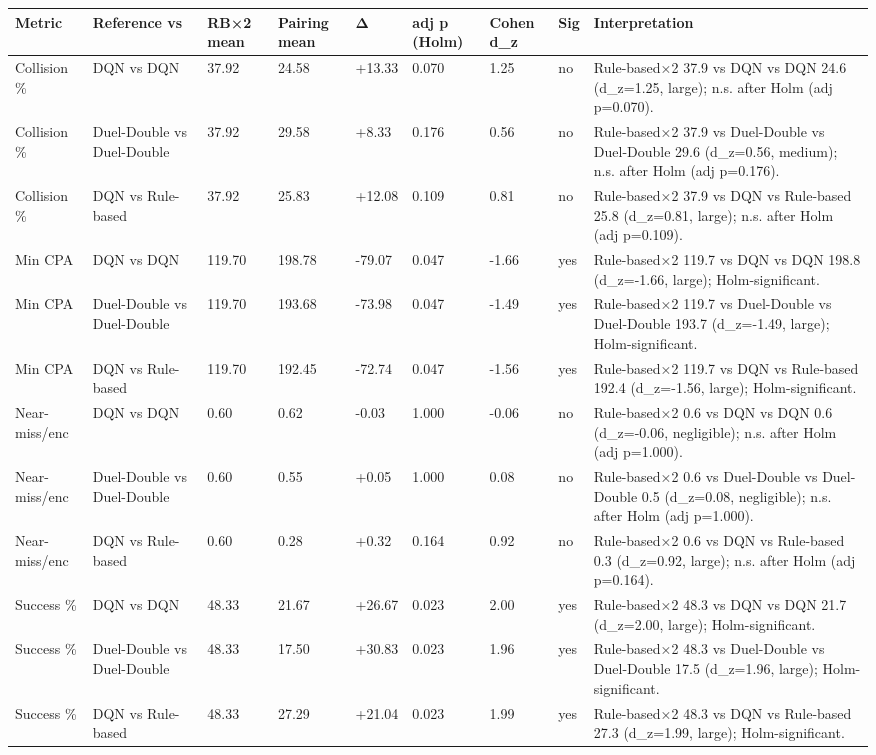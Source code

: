 \begin{tabular}{lllllllll}
\toprule
Metric & Reference vs & RB×2 mean & Pairing mean & Δ & adj p (Holm) & Cohen d\_z & Sig & Interpretation \\
\midrule
Collision \% & DQN vs DQN & 37.92 & 24.58 & +13.33 & 0.070 & 1.25 & no & Rule-based×2 37.9 vs DQN vs DQN 24.6 (d\_z=1.25, large); n.s. after Holm (adj p=0.070). \\
Collision \% & Duel-Double vs Duel-Double & 37.92 & 29.58 & +8.33 & 0.176 & 0.56 & no & Rule-based×2 37.9 vs Duel-Double vs Duel-Double 29.6 (d\_z=0.56, medium); n.s. after Holm (adj p=0.176). \\
Collision \% & DQN vs Rule-based & 37.92 & 25.83 & +12.08 & 0.109 & 0.81 & no & Rule-based×2 37.9 vs DQN vs Rule-based 25.8 (d\_z=0.81, large); n.s. after Holm (adj p=0.109). \\
Min CPA & DQN vs DQN & 119.70 & 198.78 & -79.07 & 0.047 & -1.66 & yes & Rule-based×2 119.7 vs DQN vs DQN 198.8 (d\_z=-1.66, large); Holm-significant. \\
Min CPA & Duel-Double vs Duel-Double & 119.70 & 193.68 & -73.98 & 0.047 & -1.49 & yes & Rule-based×2 119.7 vs Duel-Double vs Duel-Double 193.7 (d\_z=-1.49, large); Holm-significant. \\
Min CPA & DQN vs Rule-based & 119.70 & 192.45 & -72.74 & 0.047 & -1.56 & yes & Rule-based×2 119.7 vs DQN vs Rule-based 192.4 (d\_z=-1.56, large); Holm-significant. \\
Near-miss/enc & DQN vs DQN & 0.60 & 0.62 & -0.03 & 1.000 & -0.06 & no & Rule-based×2 0.6 vs DQN vs DQN 0.6 (d\_z=-0.06, negligible); n.s. after Holm (adj p=1.000). \\
Near-miss/enc & Duel-Double vs Duel-Double & 0.60 & 0.55 & +0.05 & 1.000 & 0.08 & no & Rule-based×2 0.6 vs Duel-Double vs Duel-Double 0.5 (d\_z=0.08, negligible); n.s. after Holm (adj p=1.000). \\
Near-miss/enc & DQN vs Rule-based & 0.60 & 0.28 & +0.32 & 0.164 & 0.92 & no & Rule-based×2 0.6 vs DQN vs Rule-based 0.3 (d\_z=0.92, large); n.s. after Holm (adj p=0.164). \\
Success \% & DQN vs DQN & 48.33 & 21.67 & +26.67 & 0.023 & 2.00 & yes & Rule-based×2 48.3 vs DQN vs DQN 21.7 (d\_z=2.00, large); Holm-significant. \\
Success \% & Duel-Double vs Duel-Double & 48.33 & 17.50 & +30.83 & 0.023 & 1.96 & yes & Rule-based×2 48.3 vs Duel-Double vs Duel-Double 17.5 (d\_z=1.96, large); Holm-significant. \\
Success \% & DQN vs Rule-based & 48.33 & 27.29 & +21.04 & 0.023 & 1.99 & yes & Rule-based×2 48.3 vs DQN vs Rule-based 27.3 (d\_z=1.99, large); Holm-significant. \\
\bottomrule
\end{tabular}
